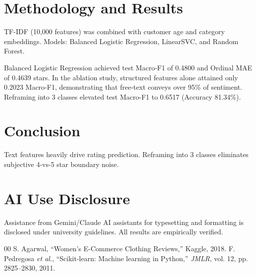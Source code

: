 \documentclass[conference]{IEEEtran}
\begin{document}
\section{Methodology and Results}
TF-IDF (10,000 features) was combined with customer age and category embeddings. Models: Balanced Logistic Regression, LinearSVC, and Random Forest.

Balanced Logistic Regression achieved test Macro-F1 of 0.4800 and Ordinal MAE of 0.4639 stars. In the ablation study, structured features alone attained only 0.2023 Macro-F1, demonstrating that free-text conveys over 95\% of sentiment. Reframing into 3 classes elevated test Macro-F1 to 0.6517 (Accuracy 81.34\%).

\section{Conclusion}
Text features heavily drive rating prediction. Reframing into 3 classes eliminates subjective 4-vs-5 star boundary noise.

\section*{AI Use Disclosure}
Assistance from Gemini/Claude AI assistants for typesetting and formatting is disclosed under university guidelines. All results are empirically verified.

\begin{thebibliography}{00}
 S. Agarwal, ``Women's E-Commerce Clothing Reviews,'' Kaggle, 2018.
 F. Pedregosa \textit{et al.}, ``Scikit-learn: Machine learning in Python,'' \textit{JMLR}, vol. 12, pp. 2825--2830, 2011.
\end{thebibliography}
\end{document}
